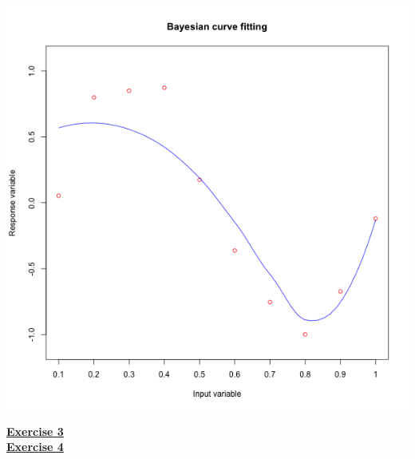 \documentclass[a4paper, 11pt]{article}\usepackage[]{graphicx}\usepackage[]{color}
\begin{document}
\begin{center}
\includegraphics[scale = 0.5]{ps2_plot2.png}
\end{center}
\newpage
\textbf{\underline{Exercise 3}}\\
\newline \textbf{\underline{Exercise 4}}\\
\end{document}
